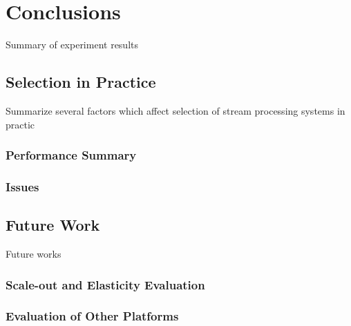 \section{Conclusions}
Summary of experiment results 

\subsection{Selection in Practice}
Summarize several factors which affect selection of stream processing systems in practic

\subsubsection{Performance Summary}
\subsubsection{Issues }

\subsection{Future Work}
Future works

\subsubsection{Scale-out and Elasticity Evaluation}
\subsubsection{Evaluation of Other Platforms}

\clearpage